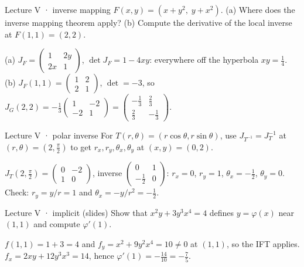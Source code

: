 \begin{problem}{Lecture V · inverse mapping}
$F(x,y)=(x+y^2,\;y+x^2)$. (a) Where does the inverse mapping theorem apply? (b) Compute the
derivative of the local inverse at $F(1,1)=(2,2)$.
\end{problem}
\begin{solution}
(a) $J_F=\begin{pmatrix}1&2y\\2x&1\end{pmatrix}$, $\det J_F=1-4xy$: everywhere off the hyperbola $xy=\tfrac14$.
(b) $J_F(1,1)=\begin{pmatrix}1&2\\2&1\end{pmatrix}$, $\det=-3$, so
$J_G(2,2)=-\tfrac13\begin{pmatrix}1&-2\\-2&1\end{pmatrix}=\begin{pmatrix}-\frac13&\frac23\\ \frac23&-\frac13\end{pmatrix}$.
\end{solution}

\begin{problem}{Lecture V · polar inverse}
For $T(r,\theta)=(r\cos\theta,r\sin\theta)$, use $J_{T^{-1}}=J_T^{-1}$ at $(r,\theta)=(2,\frac\pi2)$ to get
$r_x,r_y,\theta_x,\theta_y$ at $(x,y)=(0,2)$.
\end{problem}
\begin{solution}
$J_T(2,\frac\pi2)=\begin{pmatrix}0&-2\\1&0\end{pmatrix}$, inverse $\begin{pmatrix}0&1\\-\frac12&0\end{pmatrix}$:
$r_x=0$, $r_y=1$, $\theta_x=-\tfrac12$, $\theta_y=0$. Check: $r_y=y/r=1$ and $\theta_x=-y/r^2=-\tfrac12$.
\end{solution}

\begin{problem}{Lecture V · implicit (slides)}
Show that $x^2y+3y^3x^4=4$ defines $y=\varphi(x)$ near $(1,1)$ and compute $\varphi'(1)$.
\end{problem}
\begin{solution}
$f(1,1)=1+3=4$ and $f_y=x^2+9y^2x^4=10\ne0$ at $(1,1)$, so the IFT applies.
$f_x=2xy+12y^3x^3=14$, hence $\varphi'(1)=-\tfrac{14}{10}=-\tfrac75$.
\end{solution}

